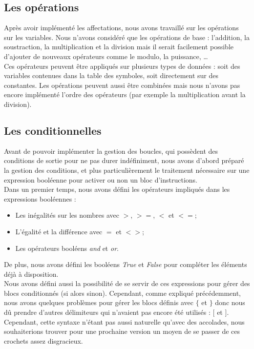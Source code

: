 		\subsection{Les opérations}
			Après avoir implémenté les affectations, nous avons travaillé sur les opérations sur les variables. Nous n'avons considéré que les opérations de base : l'addition, la soustraction, la multiplication et la division mais il serait facilement possible d'ajouter de nouveaux opérateurs comme le modulo, la puissance, \dots \\

			Ces opérateurs peuvent être appliqués sur plusieurs types de données : soit des variables contenues dans la table des symboles, soit directement sur des constantes. Les opérations peuvent aussi être combinées mais nous n'avons pas encore implémenté l'ordre des opérateurs (par exemple la multiplication avant la division).

		\subsection{Les conditionnelles}
			Avant de pouvoir implémenter la gestion des boucles, qui possèdent des conditions de sortie pour ne pas durer indéfiniment, nous avons d'abord préparé la gestion des conditions, et plus particulièrement le traitement nécessaire sur une expression booléenne pour activer ou non un bloc d'instructions. \\
			
			Dans un premier temps, nous avons défini les opérateurs impliqués dans les expressions booléennes :
			\begin{itemize}
				\item Les inégalités sur les nombres avec $>$, $>=$, $<$ et $<=$;
				\item L'égalité et la différence avec $=$ et $<>$;
				\item Les opérateurs booléens \emph{and} et \emph{or}. \\
			\end{itemize}
						
			De plus, nous avons défini les booléens \emph{True} et \emph{False} pour compléter les éléments déjà à disposition.\\
			
			Nous avons défini aussi la possibilité de se servir de ces expressions pour gérer des blocs conditionnés (si alors sinon). Cependant, comme expliqué précédemment, nous avons quelques problèmes pour gérer les blocs définis avec $\{$ et $\}$ donc nous dû prendre d'autres délimiteurs qui n'avaient pas encore été utilisés : $[$ et $]$. Cependant, cette syntaxe n'étant pas aussi naturelle qu'avec des accolades, nous souhaiterions trouver pour une prochaine version un moyen de se passer de ces crochets assez disgracieux.
			

